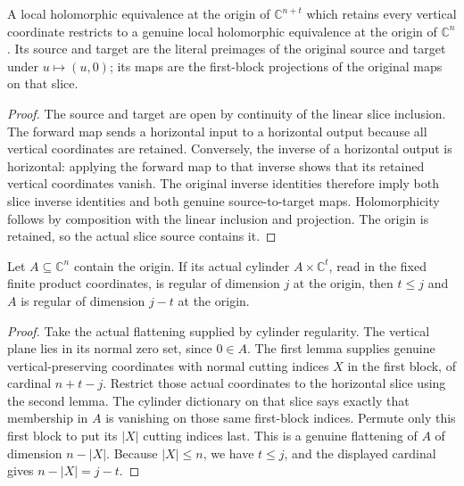 \begin{lemma}
\label{hir:saturated-cylinder-horizontal-slice-coordinates}
\leanok
{}
A local holomorphic equivalence at the origin of $\mathbb C^{n+t}$
which retains every vertical coordinate restricts to a genuine local
holomorphic equivalence at the origin of $\mathbb C^n$.  Its source and
target are the literal preimages of the original source and target under
$u\mapsto(u,0)$; its maps are the first-block projections of the original
maps on that slice.
\end{lemma}
\begin{proof}
The source and target are open by continuity of the linear slice inclusion.
The forward map sends a horizontal input to a horizontal output because
all vertical coordinates are retained.  Conversely, the inverse of a
horizontal output is horizontal: applying the forward map to that inverse
shows that its retained vertical coordinates vanish.  The original inverse
identities therefore imply both slice inverse identities and both genuine
source-to-target maps.  Holomorphicity follows by composition with the
linear inclusion and projection.  The origin is retained, so the actual
slice source contains it.
\end{proof}

\begin{theorem}
\label{hir:saturated-cylinder-regularity-reflection}
\leanok
{}
Let $A\subseteq\mathbb C^n$ contain the origin.  If its actual cylinder
$A\times\mathbb C^t$, read in the fixed finite product coordinates, is
regular of dimension $j$ at the origin, then $t\leq j$ and $A$ is regular
of dimension $j-t$ at the origin.
\end{theorem}
\begin{proof}
Take the actual flattening supplied by cylinder regularity.  The vertical
plane lies in its normal zero set, since $0\in A$.  The first lemma
supplies genuine vertical-preserving coordinates with normal cutting
indices $X$ in the first block, of cardinal $n+t-j$.  Restrict those
actual coordinates to the horizontal slice using the second lemma.
The cylinder dictionary on that slice says exactly that membership in
$A$ is vanishing on those same first-block indices.  Permute only this
first block to put its $|X|$ cutting indices last.  This is a genuine
flattening of $A$ of dimension $n-|X|$.  Because $|X|\leq n$, we have
$t\leq j$, and the displayed cardinal gives $n-|X|=j-t$.
\end{proof}

